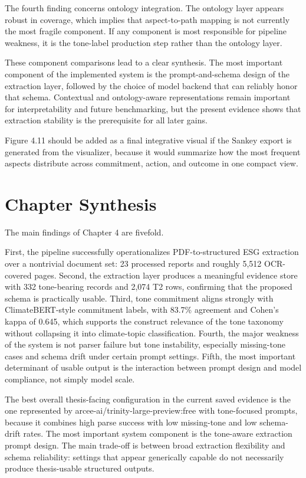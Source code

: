 \documentclass[english, online, cse, master]{dithesis}
\begin{document}
The fourth finding concerns ontology integration. The ontology layer appears robust in coverage, which implies that aspect-to-path mapping is not currently the most fragile component. If any component is most responsible for pipeline weakness, it is the tone-label production step rather than the ontology layer.

These component comparisons lead to a clear synthesis. The most important component of the implemented system is the prompt-and-schema design of the extraction layer, followed by the choice of model backend that can reliably honor that schema. Contextual and ontology-aware representations remain important for interpretability and future benchmarking, but the present evidence shows that extraction stability is the prerequisite for all later gains.

Figure 4.11 should be added as a final integrative visual if the Sankey export is generated from the visualizer, because it would summarize how the most frequent aspects distribute across commitment, action, and outcome in one compact view.

\section{Chapter Synthesis}

The main findings of Chapter 4 are fivefold.

First, the pipeline successfully operationalizes PDF-to-structured ESG extraction over a nontrivial document set: 23 processed reports and roughly 5,512 OCR-covered pages. Second, the extraction layer produces a meaningful evidence store with 332 tone-bearing records and 2,074 T2 rows, confirming that the proposed schema is practically usable. Third, tone commitment aligns strongly with ClimateBERT-style commitment labels, with 83.7\% agreement and Cohen’s kappa of 0.645, which supports the construct relevance of the tone taxonomy without collapsing it into climate-topic classification. Fourth, the major weakness of the system is not parser failure but tone instability, especially missing-tone cases and schema drift under certain prompt settings. Fifth, the most important determinant of usable output is the interaction between prompt design and model compliance, not simply model scale.

The best overall thesis-facing configuration in the current saved evidence is the one represented by arcee-ai/trinity-large-preview:free with tone-focused prompts, because it combines high parse success with low missing-tone and low schema-drift rates. The most important system component is the tone-aware extraction prompt design. The main trade-off is between broad extraction flexibility and schema reliability: settings that appear generically capable do not necessarily produce thesis-usable structured outputs.
\end{document}
